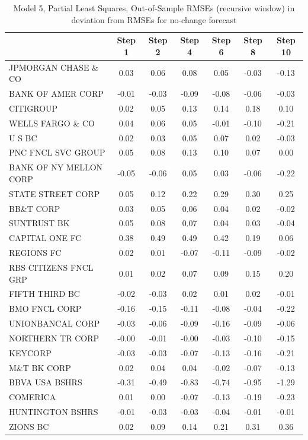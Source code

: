 \documentclass[11pt]{article}
\begin{document}
\begin{table}  
\caption{Model 5, Partial Least Squares, Out-of-Sample RMSEs (recursive window) in deviation from RMSEs for no-change forecast}                                                 
\center                                                     
\begin{tabular}{|l|c|c|c|c|c|c|}                            
\hline                                                      
&Step 1 &Step 2 &Step 4 &Step 6 &Step 8 &Step 10\\          
\hline                                                      
JPMORGAN CHASE \& CO  &0.03&0.06&0.08&0.05&-0.03&-0.13\\    
BANK OF AMER CORP     &-0.01&-0.03&-0.09&-0.08&-0.06&-0.03\\
CITIGROUP             &0.02&0.05&0.13&0.14&0.18&0.10\\      
WELLS FARGO \& CO     &0.04&0.06&0.05&-0.01&-0.10&-0.21\\   
U S BC                &0.02&0.03&0.05&0.07&0.02&-0.03\\     
PNC FNCL SVC GROUP    &0.05&0.08&0.13&0.10&0.07&0.00\\      
BANK OF NY MELLON CORP&-0.05&-0.06&0.05&0.03&-0.06&-0.22\\  
STATE STREET CORP     &0.05&0.12&0.22&0.29&0.30&0.25\\      
BB\&T CORP            &0.03&0.05&0.06&0.04&0.02&-0.02\\     
SUNTRUST BK           &0.05&0.08&0.07&0.04&0.03&-0.04\\     
CAPITAL ONE FC        &0.38&0.49&0.49&0.42&0.19&0.06\\      
REGIONS FC            &0.02&0.01&-0.07&-0.11&-0.09&-0.02\\  
RBS CITIZENS FNCL GRP &0.01&0.02&0.07&0.09&0.15&0.20\\      
FIFTH THIRD BC        &-0.02&-0.03&0.02&0.01&0.02&-0.01\\   
BMO FNCL CORP         &-0.16&-0.15&-0.11&-0.08&-0.04&-0.22\\
UNIONBANCAL CORP      &-0.03&-0.06&-0.09&-0.16&-0.09&-0.06\\
NORTHERN TR CORP      &-0.00&-0.01&-0.00&-0.03&-0.10&-0.15\\
KEYCORP               &-0.03&-0.03&-0.07&-0.13&-0.16&-0.21\\
M\&T BK CORP          &0.02&0.04&0.04&-0.02&-0.07&-0.13\\   
BBVA USA BSHRS        &-0.31&-0.49&-0.83&-0.74&-0.95&-1.29\\
COMERICA              &0.01&0.00&-0.07&-0.13&-0.19&-0.23\\  
HUNTINGTON BSHRS      &-0.01&-0.03&-0.03&-0.04&-0.01&-0.01\\
ZIONS BC              &0.02&0.09&0.14&0.21&0.31&0.36\\      
\hline                                                      
\end{tabular}                                               
\end{table}                                                 
\end{document}
